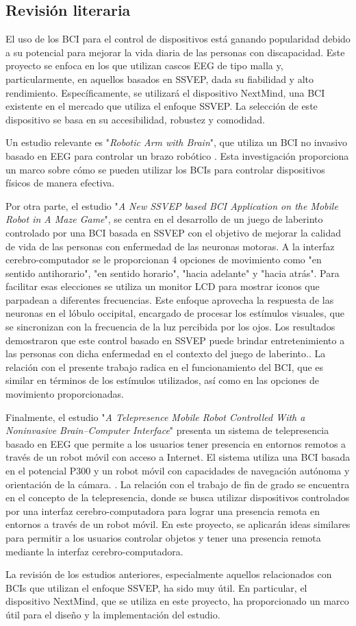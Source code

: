 \subsection{Revisión literaria}
El uso de los BCI para el control de dispositivos está ganando popularidad debido a su potencial para mejorar la vida diaria de las personas con discapacidad. Este proyecto se enfoca en los que utilizan cascos EEG de tipo malla y, particularmente, en aquellos basados en SSVEP, dada su fiabilidad y alto rendimiento.
Específicamente, se utilizará el dispositivo NextMind, una BCI existente en el mercado que utiliza el enfoque SSVEP. La selección de este dispositivo se basa en su accesibilidad, robustez y comodidad.

\bigskip

Un estudio relevante es "\textit{Robotic Arm with Brain}", que utiliza un BCI no invasivo basado en EEG para controlar un brazo robótico \cite{RoboticArmWithBrain}. Esta investigación proporciona un marco sobre cómo se pueden utilizar los BCIs para controlar dispositivos físicos de manera efectiva.

\bigskip

Por otra parte, el estudio "\textit{A New SSVEP based BCI Application on the Mobile Robot in A Maze Game}", se centra en el desarrollo de un juego de laberinto controlado por una BCI basada en SSVEP con el objetivo de mejorar la calidad de vida de las personas con enfermedad de las neuronas motoras. A la interfaz cerebro-computador se le proporcionan 4 opciones de movimiento como "en sentido antihorario", "en sentido horario", "hacia adelante" y "hacia atrás". Para facilitar esas elecciones se utiliza un monitor LCD para mostrar iconos que parpadean a diferentes frecuencias. Este enfoque aprovecha la respuesta de las neuronas en el lóbulo occipital, encargado de procesar los estímulos visuales, que se sincronizan con la frecuencia de la luz percibida por los ojos. Los resultados demostraron que este control basado en SSVEP puede brindar entretenimiento a las personas con dicha enfermedad en el contexto del juego de laberinto.\cite{SSVEPBCIRobotMazeGame}. La relación con el presente trabajo radica en el funcionamiento del BCI, que es similar en términos de los estímulos utilizados, así como en las opciones de movimiento proporcionadas.

\bigskip

Finalmente, el estudio "\textit{A Telepresence Mobile Robot Controlled With a Noninvasive Brain–Computer Interface}" presenta un sistema de telepresencia basado en EEG que permite a los usuarios tener presencia en entornos remotos a través de un robot móvil con acceso a Internet. El sistema utiliza una BCI basada en el potencial P300 y un robot móvil con capacidades de navegación autónoma y orientación de la cámara. \cite{TelepresenceMobileRobotBCI}. La relación con el trabajo de fin de grado se encuentra en el concepto de la telepresencia, donde se busca utilizar dispositivos controlados por una interfaz cerebro-computadora para lograr una presencia remota en entornos a través de un robot móvil. En este proyecto, se aplicarán ideas similares para permitir a los usuarios controlar objetos y tener una presencia remota mediante la interfaz cerebro-computadora.

La revisión de los estudios anteriores, especialmente aquellos relacionados con BCIs que utilizan el enfoque SSVEP, ha sido muy útil. En particular, el dispositivo NextMind, que se utiliza en este proyecto, ha proporcionado un marco útil para el diseño y la implementación del estudio.